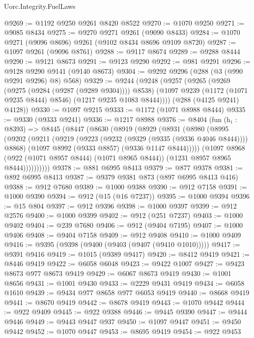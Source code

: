\begin{lexlean}{Uorc.Integrity.FuelLaws}
\begin{coremodule}
@9269 := @1192 @9250 @9261 @8420 @8522
@9270 := @1070 @9250
@9271 := @9085 @8434
@9275 := @9270 @9271 @9261 (@9090 @8433)
@9284 := @1070 @9271 (@9096 @8696) @9261 (@9102 @8434 @8696 @9109 @8720)
@9287 := @1097 @9261 (@9096 @8761)
@9288 := @9117 @8674
@9289 := @9288 @8444
@9290 := @9121 @8673
@9291 := @9123 @9290
@9292 := @981 @9291
@9296 := @9128 @9290 @9141 (@9140 @8673)
@9304 := @9292 @9296 (@288 (@3 (@990 @9291 @9296) @8) @568)
@9329 := @9244
    (@9248
      (@9257
        (@9265
          (@9269 (@9275 (@9284 (@9287 (@9289 @9304)))) @8538)
          (@1097 @9239 (@1172 (@1071 @9235 @8444) @8546) (@1217 @9235 @1083 @8444))))
      (@288 (@4125 @9241) @4128))
@9330 := @1097 @9215
@9333 := @1172 (@1071 @8988 @8444)
@9335 := @9330 (@9333 @9241)
@9336 := @1217 @8988
@9376 := @8404
    (fun (h₁ : @8393) =>
    @8445
      (@8447
        (@8630
          (@8919
            (@8929
              (@8931
                (@8980
                  (@8995
                    (@9202
                      (@9211
                        (@9219
                          (@9223 (@9232 (@9329 (@9335 (@9336 @4046 @8444)))) @8868)
                          (@1097 @8992 (@9333 @8857) (@9336 @1147 @8444)))))
                    (@1097
                      @8968
                      (@922 (@1071 @8957 @8444) (@1071 @8965 @8444))
                      (@1231 @8957 @8965 @8444))))))))))
@9378 := @881 @6995 @8413
@9379 := @877 @9378
@9381 := @892 @6995 @8413
@9387 := @9379 @9381 @873 (@897 @6995 @8413 @416)
@9388 := @912 @7680
@9389 := @1000 @9388
@9390 := @912 @7158
@9391 := @1000 @9390
@9394 := @912 (@15 (@16 @7237))
@9395 := @1000 @9394
@9396 := @15 @804
@9397 := @912 @9396
@9398 := @1000 @9397
@9399 := @912 @2576
@9400 := @1000 @9399
@9402 := @912 (@251 @7237)
@9403 := @1000 @9402
@9404 := @239 @7680
@9406 := @912 (@9404 @7195)
@9407 := @1000 @9406
@9408 := @9404 @7158
@9409 := @912 @9408
@9410 := @1000 @9409
@9416 := @9395 (@9398 (@9400 (@9403 (@9407 (@9410 @1010)))))
@9417 := @9391 @9416
@9419 := @1015 (@9389 @9417)
@9420 := @8412 @9419
@9421 := @8446 @9419
@9422 := @6058 @6048
@9423 := @9422 @1007
@9427 := @9423 @8673 @977 @8673 @9419
@9429 := @6067 @8673 @9419
@9430 := @1001 @8656
@9431 := @1001 @9430
@9433 := @2229 @9431 @9419
@9434 := @6058 @1610
@9439 := @9434 @977 @8658 @977 @6053 @9419
@9440 := @8668 @9419
@9441 := @8670 @9419
@9442 := @8678 @9419
@9443 := @1070 @9442
@9444 := @922 @9409
@9445 := @922 @9388
@9446 := @9445 @9390
@9447 := @9444 @9446
@9449 := @9443 @9447 @937
@9450 := @1097 @9447
@9451 := @9450 @9442
@9452 := @1070 @9447
@9453 := @8695 @9419
@9454 := @922 @9453

\end{coremodule}
\end{lexlean}
